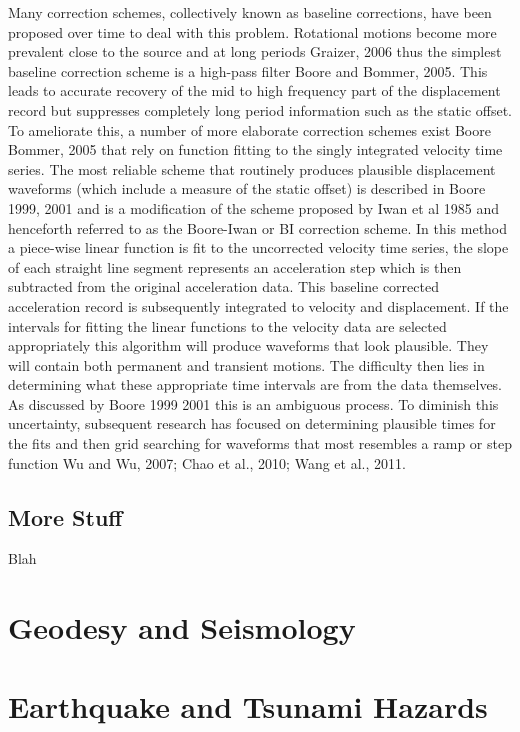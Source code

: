 Many correction schemes, collectively known as baseline corrections, have been proposed over time to deal with this problem. Rotational motions become more prevalent close to the source and at long periods Graizer, 2006 thus the simplest baseline correction scheme is a high-pass filter Boore and Bommer, 2005. This leads to accurate recovery of the mid to high frequency part of the displacement record but suppresses completely long period information such as the static offset.
	To ameliorate this, a number of more elaborate correction schemes exist Boore  Bommer, 2005 that rely on function fitting to the singly integrated velocity time series. The most reliable scheme that routinely produces plausible displacement waveforms (which include a measure of the static offset) is described in Boore 1999, 2001 and is a modification of the scheme proposed by Iwan et al 1985 and henceforth referred to as the Boore-Iwan or BI correction scheme. In this method a piece-wise linear function is fit to the uncorrected velocity time series, the slope of each straight line segment represents an acceleration step which is then subtracted from the original acceleration data. This baseline corrected acceleration record is subsequently integrated to velocity and displacement. If the intervals for fitting the linear functions to the velocity data are selected appropriately this algorithm will produce waveforms that look plausible. They will contain both permanent and transient motions. The difficulty then lies in determining what these appropriate time intervals are from the data themselves. As discussed by Boore 1999  2001 this is an ambiguous process. To diminish this uncertainty, subsequent research has focused on determining plausible times for the fits and then grid searching for waveforms that most resembles a ramp or step function Wu and Wu, 2007; Chao et al., 2010; Wang et al., 2011.

\subsection{More Stuff}
Blah



\section{Geodesy and Seismology}

\section{Earthquake and Tsunami Hazards}



